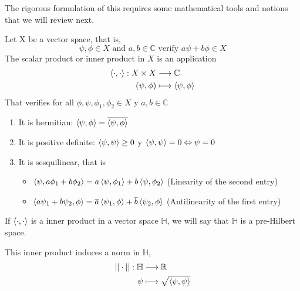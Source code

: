 The rigorous formulation of this requires some mathematical tools and notions that we will review next.

\begin{definicion}
    Let X be a vector space, that is, 
    \begin{equation*}
        \psi,\phi \in X \text{ and } a,b \in \mathbb{C} \text{ verify } a\psi+b\phi \in X
    \end{equation*}
    The scalar product or inner product in $X$ is an application 
    \begin{align*}
        \braket{\cdot,\cdot}:X\times X &\longrightarrow \mathbb{C} \\
        (\psi, \phi) &\longmapsto \braket{\psi,\phi}
    \end{align*}
    That verifies for all $\phi, \psi, \phi_1, \phi_2 \in X$ y $a,b\in \mathbb{C}$
        \begin{enumerate}
            \item It is hermitian: $\braket{\psi,\phi} = \overline{\braket{\psi,\phi}}$ 
            \item It is positive definite: $\braket{\psi,\psi}\geq 0$ y $\braket{\psi,\psi}=0 \Leftrightarrow \psi = 0$
            \item It is sesquilinear, that is
                \begin{itemize}
                    \item $\braket{\psi,a\phi_1+b\phi_2}=a\braket{\psi,\phi_1}+b\braket{\psi,\phi_2}$ (Linearity of the second entry)
                    \item $\braket{a\psi_1 + b\psi_2,\phi}=\overline{a}\braket{\psi_1,\phi}+\overline{b}\braket{\psi_2,\phi}$ (Antilinearity of the first entry)
                \end{itemize}
        \end{enumerate}
\end{definicion}

\begin{definicion}
    If $\braket{\cdot , \cdot}$ is a inner product in a vector space $\mathbb{H}$, we will say that $\mathbb{H}$ is a pre-Hilbert space.
\end{definicion}

This inner product induces a norm in $\mathbb{H}$, 
\begin{align}
    || \cdot ||:\mathbb{H} &\longrightarrow \mathbb{R}\\
    \psi &\longmapsto \sqrt{\braket{\psi,\psi}}
\end{align}


